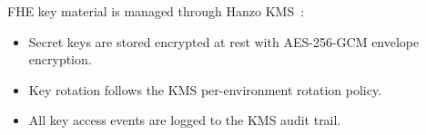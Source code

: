 FHE key material is managed through Hanzo KMS~\cite{hanzokms}:
\begin{itemize}[leftmargin=1.1em]
    \item Secret keys are stored encrypted at rest with AES-256-GCM envelope
    encryption.
    \item Key rotation follows the KMS per-environment rotation policy.
    \item All key access events are logged to the KMS audit trail.
\end{itemize}

